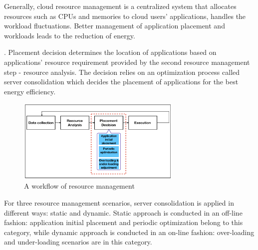 Generally, cloud resource management is a centralized system \cite{Jennings:2015ht} that allocates resources such as CPUs and memories to cloud users' applications, handles the workload fluctuations. Better management of application placement and workloads leads to the reduction of energy. 

. Placement decision determines the location of applications based on applications' resource requirement provided by the second resource management step - resource analysis. The decision relies on an optimization process called server consolidation which decides the placement of applications for the best energy efficiency. 
\begin{figure}
	\centering
	\includegraphics[width=0.7\textwidth]{pics/workflow_management.png}
	\caption{A workflow of resource management \cite{Mishra:2012kx}}
	\label{fig:workflow}
\end{figure}



 For three resource management scenarios, server consolidation is applied in different ways: static and dynamic. Static approach is conducted in an off-line fashion: application initial placement and periodic optimization belong to this category, while dynamic approach is conducted in an on-line fashion: over-loading and under-loading scenarios are in this category.


